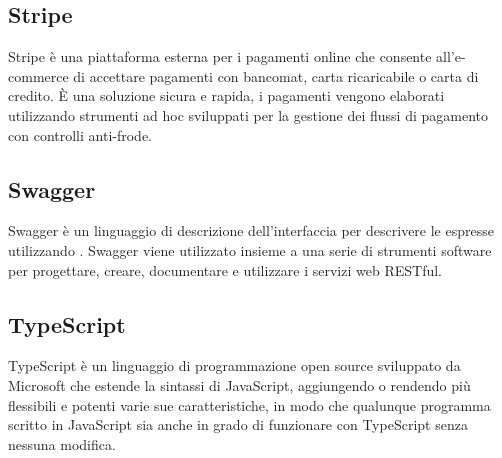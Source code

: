 \subsection{Stripe}
Stripe è una piattaforma esterna per i pagamenti online che consente all'e-commerce di accettare pagamenti con bancomat, carta ricaricabile o carta di credito. È una soluzione sicura e rapida, i pagamenti vengono elaborati utilizzando strumenti ad hoc sviluppati per la gestione dei flussi di pagamento con controlli anti-frode.

\subsection{Swagger}
Swagger è un linguaggio di descrizione dell'interfaccia per descrivere le   espresse utilizzando . Swagger viene utilizzato insieme a una serie di strumenti software  per progettare, creare, documentare e utilizzare i servizi web RESTful.

\subsection{TypeScript}
TypeScript è un linguaggio di programmazione open source sviluppato da Microsoft che estende la sintassi di JavaScript, aggiungendo o rendendo più flessibili e potenti varie sue caratteristiche, in modo che qualunque programma scritto in JavaScript sia anche in grado di funzionare con TypeScript senza nessuna modifica.
